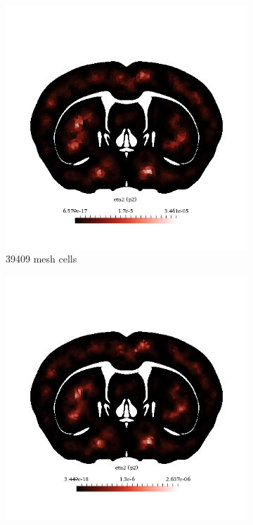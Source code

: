 \begin{figure}[h!]
  \centering
    \begin{subfigure}[b]{0.49\textwidth}
    \includegraphics[width=\textwidth,height=\textheight,keepaspectratio,height=\textheight,keepaspectratio]{figures/4_mpet/biomedical/space/eta2_p2_1.png}
    \caption{39409 mesh cells}
  \end{subfigure}
  \begin{subfigure}[b]{0.49\textwidth}
    \includegraphics[width=\textwidth,height=\textheight,keepaspectratio,height=\textheight,keepaspectratio]{figures/4_mpet/biomedical/space/eta2_p2_2.png}

\end{subfigure}
\end{figure}
